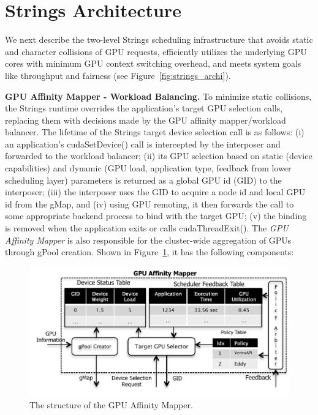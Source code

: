 \section{Strings Architecture}
We next describe the two-level Strings scheduling infrastructure that avoids static and character collisions of GPU requests, efficiently utilizes the underlying GPU cores with minimum GPU context switching overhead, and meets system goals like throughput and fairness (see Figure~\ref{fig:strings_archi}).

\textbf{GPU Affinity Mapper - Workload Balancing. }To minimize static collisions, the Strings runtime overrides the application's target GPU selection calls, replacing them with decisions made by the GPU affinity mapper/workload balancer. The lifetime of the Strings target device selection call is as follows: (i) an application's cudaSetDevice() call is intercepted by the interposer and forwarded to the workload balancer; (ii) its GPU selection based on static (device capabilities) and dynamic (GPU load, application type, feedback from lower scheduling layer) parameters is returned as a global GPU id (GID) to the interposer; (iii) the interposer uses the GID to acquire a node id and local GPU id from the gMap, and (iv) using GPU remoting, it then forwards the call to some appropriate backend process to bind with the target GPU; (v) the binding is removed when the application exits or calls cudaThreadExit(). The \textit{GPU Affinity Mapper} is also responsible for the cluster-wide aggregation of GPUs through gPool creation. Shown in Figure~\ref{fig:affinity}, it has the following components:
\begin{figure}[!t]
\centering
\includegraphics[width=\textwidth,height=\textheight,keepaspectratio]{figures/strings_archi2.pdf}
\caption{The structure of the GPU Affinity Mapper.}
\label{fig:affinity}
\end{figure}
